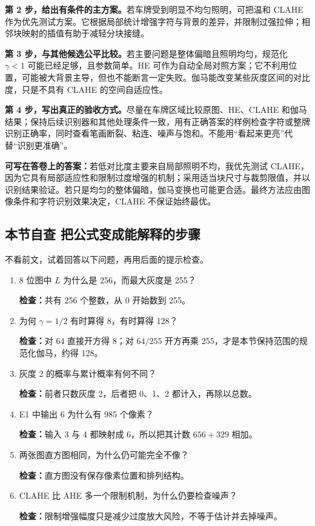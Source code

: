 \textbf{第 2 步，给出有条件的主方案。}若车牌受到明显不均匀照明，可把温和 CLAHE 作为优先测试方案。它根据局部统计增强字符与背景的差异，并限制过强拉伸；相邻块映射的插值有助于减轻分块接缝。

\textbf{第 3 步，与其他候选公平比较。}若主要问题是整体偏暗且照明均匀，规范化 $\gamma<1$ 可能已经足够，且参数简单。HE 可作为自动全局对照方案；它不利用位置，可能被大背景主导，但也不能断言一定失败。伽马能改变某些灰度区间的对比度，只是不具有 CLAHE 的空间自适应性。

\textbf{第 4 步，写出真正的验收方式。}尽量在车牌区域比较原图、HE、CLAHE 和伽马结果；保持后续识别器和其他处理条件一致，用有正确答案的样例检查字符或整牌识别正确率，同时查看笔画断裂、粘连、噪声与饱和。不能用“看起来更亮”代替“识别更准确”。

\textbf{可写在答卷上的答案：}若低对比度主要来自局部照明不均，我优先测试 CLAHE，因为它具有局部适应性和限制过度增强的机制；采用适当块尺寸与裁剪限值，并以识别结果验证。若只是均匀的整体偏暗，伽马变换也可能更合适。最终方法应由图像条件和字符识别效果决定，CLAHE 不保证始终最优。

\subsection{本节自查 把公式变成能解释的步骤}

不看前文，试着回答以下问题，再用后面的提示检查。
\begin{enumerate}[leftmargin=*]
\item 8 位图中 $L$ 为什么是 256，而最大灰度是 255？\par
\textbf{检查：}共有 256 个整数，从 0 开始数到 255。
\item 为何 $\gamma=1/2$ 有时算得 8，有时算得 128？\par
\textbf{检查：}对 64 直接开方得 8；对 $64/255$ 开方再乘 255，才是本节保持范围的规范化伽马，约得 128。
\item 灰度 2 的概率与累计概率有何不同？\par
\textbf{检查：}前者只数灰度 2，后者把 0、1、2 都计入，再除以总数。
\item E1 中输出 6 为什么有 985 个像素？\par
\textbf{检查：}输入 3 与 4 都映射成 6，所以把其计数 $656+329$ 相加。
\item 两张图直方图相同，为什么仍可能完全不像？\par
\textbf{检查：}直方图没有保存像素位置和排列结构。
\item CLAHE 比 AHE 多一个限制机制，为什么仍要检查噪声？\par
\textbf{检查：}限制增强幅度只是减少过度放大风险，不等于估计并去掉噪声。
\end{enumerate}
